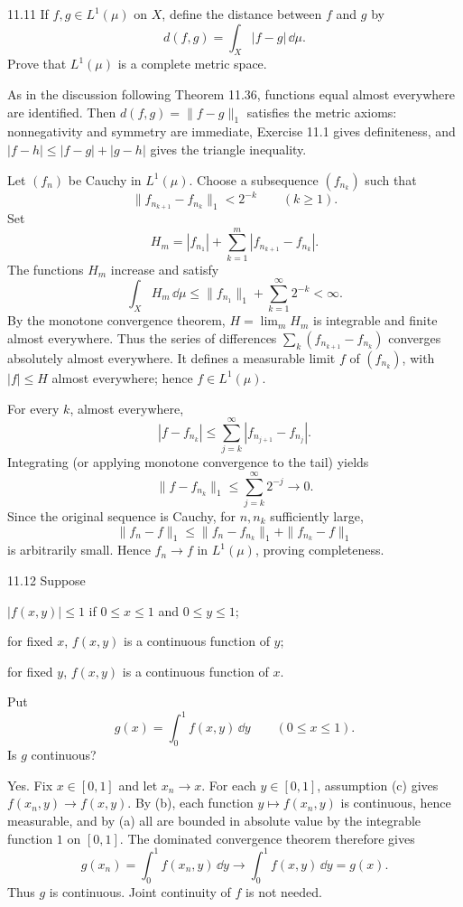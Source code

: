 \documentclass[11pt,oneside]{article}
\begin{document}
\begin{exercise}{11.11}
If $f,g\in L^1(\mu)$ on $X$, define the distance between $f$ and $g$ by
\[
 d(f,g)=\int_X|f-g|\,\dd\mu.
\]
Prove that $L^1(\mu)$ is a complete metric space.
\end{exercise}
\begin{solution}
As in the discussion following Theorem 11.36, functions equal almost everywhere are identified. Then $d(f,g)=\|f-g\|_1$ satisfies the metric axioms: nonnegativity and symmetry are immediate, Exercise 11.1 gives definiteness, and $|f-h|\le|f-g|+|g-h|$ gives the triangle inequality.

Let $(f_n)$ be Cauchy in $L^1(\mu)$. Choose a subsequence $(f_{n_k})$ such that
\[
 \|f_{n_{k+1}}-f_{n_k}\|_1<2^{-k}
 \qquad(k\ge1).
\]
Set
\[
 H_m=|f_{n_1}|+\sum_{k=1}^{m}|f_{n_{k+1}}-f_{n_k}|.
\]
The functions $H_m$ increase and satisfy
\[
 \int_XH_m\,\dd\mu
 \le\|f_{n_1}\|_1+\sum_{k=1}^\infty2^{-k}<\infty.
\]
By the monotone convergence theorem, $H=\lim_m H_m$ is integrable and finite almost everywhere. Thus the series of differences
$\sum_k(f_{n_{k+1}}-f_{n_k})$ converges absolutely almost everywhere. It defines a measurable limit $f$ of $(f_{n_k})$, with $|f|\le H$ almost everywhere; hence $f\in L^1(\mu)$.

For every $k$, almost everywhere,
\[
 |f-f_{n_k}|\le\sum_{j=k}^\infty|f_{n_{j+1}}-f_{n_j}|.
\]
Integrating (or applying monotone convergence to the tail) yields
\[
 \|f-f_{n_k}\|_1\le\sum_{j=k}^\infty2^{-j}\longrightarrow0.
\]
Since the original sequence is Cauchy, for $n,n_k$ sufficiently large,
\[
 \|f_n-f\|_1\le\|f_n-f_{n_k}\|_1+\|f_{n_k}-f\|_1
\]
is arbitrarily small. Hence $f_n\to f$ in $L^1(\mu)$, proving completeness.
\end{solution}

\begin{exercise}{11.12}
Suppose
\begin{exercisesubparts}
\item $|f(x,y)|\le1$ if $0\le x\le1$ and $0\le y\le1$;
\item for fixed $x$, $f(x,y)$ is a continuous function of $y$;
\item for fixed $y$, $f(x,y)$ is a continuous function of $x$.
\end{exercisesubparts}
Put
\[
 g(x)=\int_0^1f(x,y)\,\dd y\qquad(0\le x\le1).
\]
Is $g$ continuous?
\end{exercise}
\begin{solution}
Yes. Fix $x\in[0,1]$ and let $x_n\to x$. For each $y\in[0,1]$, assumption (c) gives $f(x_n,y)\to f(x,y)$. By (b), each function $y\mapsto f(x_n,y)$ is continuous, hence measurable, and by (a) all are bounded in absolute value by the integrable function $1$ on $[0,1]$. The dominated convergence theorem therefore gives
\[
 g(x_n)=\int_0^1f(x_n,y)\,\dd y
 \longrightarrow\int_0^1f(x,y)\,\dd y=g(x).
\]
Thus $g$ is continuous. Joint continuity of $f$ is not needed.
\end{solution}
\end{document}

